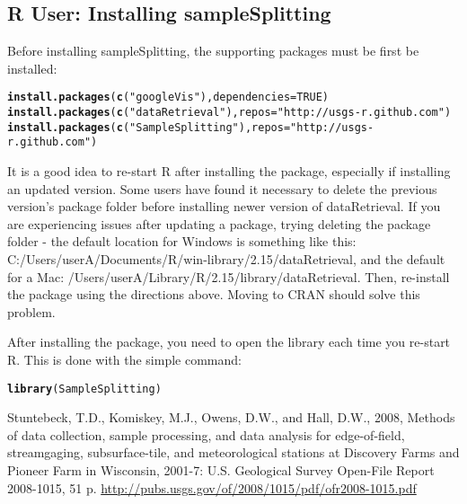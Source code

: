 \documentclass[a4paper,11pt]{article}\usepackage[]{graphicx}\usepackage[]{color}
\makeatletter
\newcommand{\hlnum}[1]{\textcolor[rgb]{0.686,0.059,0.569}{#1}}%
\newcommand{\hlstr}[1]{\textcolor[rgb]{0.192,0.494,0.8}{#1}}%
\newcommand{\hlstd}[1]{\textcolor[rgb]{0.345,0.345,0.345}{#1}}%
\newcommand{\hlkwc}[1]{\textcolor[rgb]{0.333,0.667,0.333}{#1}}%
\newcommand{\hlkwd}[1]{\textcolor[rgb]{0.737,0.353,0.396}{\textbf{#1}}}%
\newenvironment{kframe}{%
 \def\at@end@of@kframe{}%
 \ifinner\ifhmode%
  \def\at@end@of@kframe{\end{minipage}}%
  \begin{minipage}{\columnwidth}%
 \fi\fi%
 \def\FrameCommand##1{\hskip\@totalleftmargin \hskip-\fboxsep
 \colorbox{shadecolor}{##1}\hskip-\fboxsep
     \hskip-\linewidth \hskip-\@totalleftmargin \hskip\columnwidth}%
 \MakeFramed {\advance\hsize-\width
   \@totalleftmargin\z@ \linewidth\hsize
   \@setminipage}}%
 {\par\unskip\endMakeFramed%
 \at@end@of@kframe}
\newenvironment{knitrout}{}{} %
\makeatother
\begin{document}
\subsection{R User: Installing sampleSplitting}
Before installing sampleSplitting, the supporting packages must be first be installed:

\begin{knitrout}
\color{fgcolor}\begin{kframe}
\begin{alltt}
\hlkwd{install.packages}\hlstd{(}\hlkwd{c}\hlstd{(}\hlstr{"googleVis"}\hlstd{),} \hlkwc{dependencies}\hlstd{=}\hlnum{TRUE}\hlstd{)}
\hlkwd{install.packages}\hlstd{(}\hlkwd{c}\hlstd{(}\hlstr{"dataRetrieval"}\hlstd{),} \hlkwc{repos}\hlstd{=}\hlstr{"http://usgs-r.github.com"}\hlstd{)}
\hlkwd{install.packages}\hlstd{(}\hlkwd{c}\hlstd{(}\hlstr{"SampleSplitting"}\hlstd{),} \hlkwc{repos}\hlstd{=}\hlstr{"http://usgs-r.github.com"}\hlstd{)}
\end{alltt}
\end{kframe}
\end{knitrout}


It is a good idea to re-start R after installing the package, especially if installing an updated version. Some users have found it necessary to delete the previous version's package folder before installing newer version of dataRetrieval. If you are experiencing issues after updating a package, trying deleting the package folder - the default location for Windows is something like this: C:/Users/userA/Documents/R/win-library/2.15/dataRetrieval, and the default for a Mac: /Users/userA/Library/R/2.15/library/dataRetrieval. Then, re-install the package using the directions above. Moving to CRAN should solve this problem.

After installing the package, you need to open the library each time you re-start R.  This is done with the simple command:
\begin{knitrout}
\color{fgcolor}\begin{kframe}
\begin{alltt}
\hlkwd{library}\hlstd{(SampleSplitting)}
\end{alltt}
\end{kframe}
\end{knitrout}


\clearpage

\begin{thebibliography}{10}

Stuntebeck, T.D., Komiskey, M.J., Owens, D.W., and Hall, D.W., 2008, Methods of data collection, sample processing, and data analysis for edge-of-field, streamgaging, subsurface-tile, and meteorological stations at Discovery Farms and Pioneer Farm in Wisconsin, 2001-7: U.S. Geological Survey Open-File Report 2008-1015, 51 p.
\url{http://pubs.usgs.gov/of/2008/1015/pdf/ofr2008-1015.pdf}

\end{thebibliography}
\end{document}
